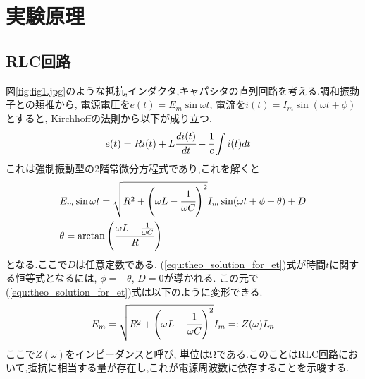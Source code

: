 \section{実験原理}
\subsection{RLC回路}
図\ref{fig:fig1.jpg}のような抵抗,インダクタ,キャパシタの直列回路を考える.調和振動子との類推から,
電源電圧を$e(t)=E_m\sin \omega t$, 電流を$i(t)=I_m\sin (\omega t+\phi)$とすると, Kirchhoffの法則から以下が成り立つ.
\begin{align}
  \label{equ:theo_RLC}
  &e(t)=Ri(t)+L\cfrac{di(t)}{dt}+\cfrac{1}{c}\int i(t)dt
\end{align}
これは強制振動型の2階常微分方程式であり,これを解くと
\begin{align}
  \label{equ:theo_solution_for_et}
  &E_m\sin \omega t=\sqrt{R^2+\left(\omega L-\cfrac{1}{\omega C}\right)^2}I_m\sin (\omega t+\phi+\theta)+D\\
  \label{equ:theo_theta}
  &\theta=\arctan\left(\cfrac{\omega L-\frac{1}{\omega C}}{R}\right)
\end{align}
となる.ここで$D$は任意定数である. (\ref{equ:theo_solution_for_et})式が時間$t$に関する恒等式となるには, $\phi=-\theta$, $D=0$が導かれる.
この元で(\ref{equ:theo_solution_for_et})式は以下のように変形できる.
\begin{align}
  \label{equ:theo_Em}
  E_m=\sqrt{R^2+\left(\omega L-\cfrac{1}{\omega C}\right)^2}I_m =: Z(\omega)I_m
\end{align}
ここで$Z(\omega)$をインピーダンスと呼び, 単位は\si{\ohm}である.このことはRLC回路において,抵抗に相当する量が存在し,これが電源周波数に依存することを示唆する.
